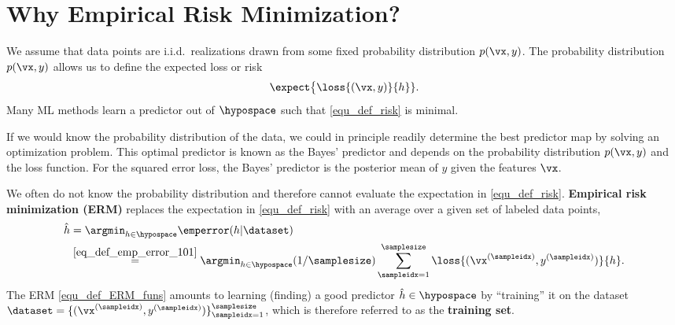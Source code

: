 \documentclass[12pt]{report}
\begin{document}

\section{Why Empirical Risk Minimization?} 
\label{equ_sec_emp_risk_approximates_expected_loss}

We assume that data points are i.i.d.\ realizations drawn from some fixed 
probability distribution $p(\vx,y)$. The probability distribution $p(\vx,y)$ 
allows us to define the expected loss or risk 
\begin{equation}
\label{equ_def_risk} 
\expect \big \{ \loss{(\vx,y)}{h} \}.
\end{equation}
Many ML methods learn a predictor out of $\hypospace$ such 
that \eqref{equ_def_risk} is minimal. 

If we would know the probability distribution of the data, we could 
in principle readily determine the best predictor map by solving an 
optimization problem. This optimal predictor is known as the Bayes' 
predictor and depends on the probability distribution $p(\vx,y)$ 
and the loss function. For the squared error loss, the Bayes' 
predictor is the posterior mean of $y$ given the features $\vx$. 

We often do not know the probability distribution and therefore 
cannot evaluate the expectation in \eqref{equ_def_risk}. 
 {\bf Empirical risk minimization (ERM)} replaces the expectation in 
 \eqref{equ_def_risk} with an average over a given set of labeled data points,  
\begin{align}
\label{equ_def_ERM_funs}
   \hat{h} & = \argmin_{h \in \hypospace} \emperror(h|\dataset) \nonumber \\ 
   & \stackrel{\eqref{eq_def_emp_error_101}}{=}  \argmin_{h \in \hypospace} (1/\samplesize) \sum_{\sampleidx=1}^{\samplesize} \loss{(\vx^{(\sampleidx)},y^{(\sampleidx)})}{h}.
\end{align}
The ERM \eqref{equ_def_ERM_funs} amounts to learning (finding) a 
good predictor $\hat{h} \in \hypospace$ by ``training'' it on the 
dataset $\dataset = \{ (\vx^{(\sampleidx)},y^{(\sampleidx)}) \}_{\sampleidx=1}^{\samplesize}$, 
which is therefore referred to as the {\bf training set}. 
\end{document}
